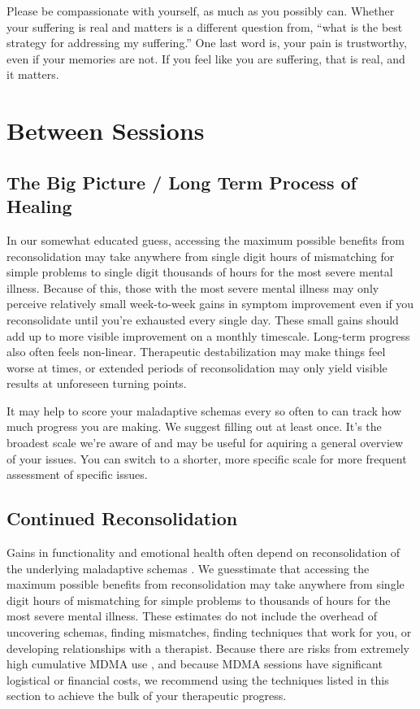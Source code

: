 \documentclass[12pt,letterpaper]{book}
\begin{document}
Please be compassionate with yourself, as much as you possibly can. Whether your suffering is real and matters is a different question from, “what is the best strategy for addressing my suffering.” One last word is, your pain is trustworthy, even if your memories are not. If you feel like you are suffering, that is real, and it matters.
\chapter{Between Sessions}
\section{The Big Picture / Long Term Process of Healing}
In our somewhat educated guess, accessing the maximum possible benefits from reconsolidation may take anywhere from single digit hours of mismatching for simple problems to single digit thousands of hours for the most severe mental illness. Because of this, those with the most severe mental illness may only perceive relatively small week-to-week gains in symptom improvement even if you reconsolidate until you're exhausted every single day. These small gains should add up to more visible improvement on a monthly timescale. Long-term progress also often feels non-linear. Therapeutic destabilization may make things feel worse at times, or extended periods of reconsolidation may only yield visible results at unforeseen turning points.

It may help to score your maladaptive schemas every so often to can track how much progress you are making. We suggest filling out \textcite{maladaptiveSchemaScale} at least once. It's the broadest scale we're aware of and may be useful for aquiring a general overview of your issues. You can switch to a shorter, more specific scale for more frequent assessment of specific issues.
\section{Continued Reconsolidation}
\label{sec:moreReconsolidation}
Gains in functionality and emotional health often depend on reconsolidation of the underlying maladaptive schemas \cite{eckerUnlocking}. We guesstimate that accessing the maximum possible benefits from reconsolidation may take anywhere from single digit hours of mismatching for simple problems to thousands of hours for the most severe mental illness. These estimates do not include the overhead of uncovering schemas, finding mismatches, finding techniques that work for you, or developing relationships with a therapist. Because there are risks from extremely high cumulative MDMA use \cite{tagen2023valvular}, and because MDMA sessions have significant logistical or financial costs, we recommend using the techniques listed in this section to achieve the bulk of your therapeutic progress.
\end{document}
